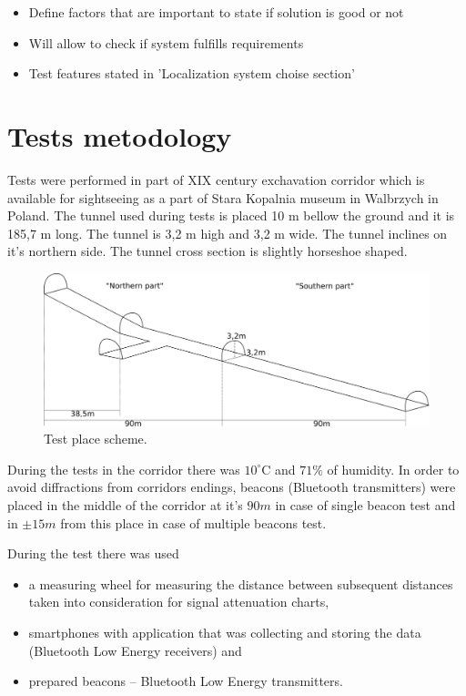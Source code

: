 \documentclass[../main.tex]{subfiles}
\begin{document}
\begin{itemize}
	\item Define factors that are important to state if solution is good or not
	\item Will allow to check if system fulfills requirements
	\item Test features stated in 'Localization system choise section'
\end{itemize}


\section{Tests metodology} %
\label{sec:tests_metodology}

Tests were performed in part of XIX century exchavation corridor which is available for sightseeing as a part of Stara Kopalnia museum in Walbrzych in Poland. The tunnel used during tests is placed 10 m bellow the ground and it is 185,7 m long. The tunnel is 3,2 m high and 3,2 m wide.  The tunnel inclines on it's northern side. The tunnel cross section is slightly horseshoe shaped.

\begin{figure}[!htbp]
\includegraphics[width=\textwidth, keepaspectratio]{pictures/corridor.pdf}
\centering
\caption{Test place scheme.}
\label{fig:corridor}
\end{figure}

During the tests in the corridor there was $10^\circ$C  and $71 \%$ of humidity. In order to avoid diffractions from corridors endings, beacons (Bluetooth transmitters) were placed in the middle of the corridor at it's $90 m$ in case of single beacon test and in $\pm15 m$ from this place in case of multiple beacons test.

During the test there was used
\begin{itemize}
	\item a measuring wheel for measuring the distance between subsequent distances taken into consideration for signal attenuation charts,
	\item smartphones with application that was collecting and storing the data (Bluetooth Low Energy receivers) and
	\item prepared beacons -- Bluetooth Low Energy transmitters.
\end{itemize}
\end{document}
